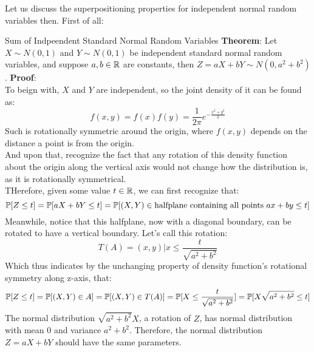 Let us discuss the superpositioning properties for independent normal random variables then. First of all:
\begin{ln-theorem}{Sum of Indpeendent Standard Normal Random Variables}{}
    \textbf{Theorem}: Let $X \sim N(0, 1)$ and $Y \sim N(0, 1)$ be independent standard normal random variables, and suppose $a, b \in \R$ are constants, then $Z = aX + bY \sim N(0, a^2 + b^2)$.
    \tcblower
    \textbf{Proof}: \\
    To beign with, $X$ and $Y$ are independent, so the joint density of it can be found as:
    \[
        f(x, y) = f(x)f(y) = \frac{1}{2\pi}e^{-\frac{x^2 + y^2}{2}}
    \]
    Such is rotationally symmetric around the origin, where $f(x, y)$ depends on the distance a point is from the origin. \\
    And upon that, recognize the fact that any rotation of this density function about the origin along the vertical axis would not change how the distribution is, as it is rotationally symmetrical. \\
    THerefore, given some value $t \in \R$, we can first recognize that:
    \[\P[Z \leq t] = \P[aX + bY \leq t] = \P[(X, Y) \in \text{halfplane containing all points $ax + by \leq t$}]\]
    Meanwhile, notice that this halfplane, now with a diagonal boundary, can be rotated to have a vertical boundary. Let's call this rotation:
    \[T(A) = {(x, y) | x \leq \frac{t}{\sqrt{a^2 + b^2}}}\]
    Which thus indicates by the unchanging property of density function's rotational symmetry along z-axis, that:
    \[
        \P[Z \leq t] = \P[(X, Y) \in A] = \P[(X, Y) \in T(A)] = \P[X \leq \frac{t}{\sqrt{a^2 + b^2}}] = \P[X\sqrt{a^2 + b^2} \leq t]
    \]
    The normal distribution $\sqrt{a^2 + b^2}X$, a rotation of $Z$, has normal distribution with mean $0$ and variance $a^2 + b^2$. Therefore, the normal distribution $Z = aX + bY$ should have the same parameters.
\end{ln-theorem}


